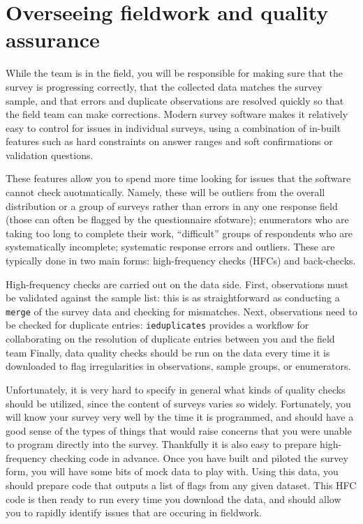 
\section{Overseeing fieldwork and quality assurance}

While the team is in the field, you will be responsible
for making sure that the survey is progressing correctly,
that the collected data matches the survey sample,
and that errors and duplicate observations are resolved
quickly so that the field team can make corrections.
Modern survey software makes it relatively easy
to control for issues in individual surveys,
using a combination of in-built features
such as hard constraints on answer ranges
and soft confirmations or validation questions.

These features allow you to spend more time
looking for issues that the software cannot check auotmatically.
Namely, these will be outliers from the overall distribution
or a group of surveys rather than errors in any one response field
(those can often be flagged by the questionnaire sfotware);
enumerators who are taking too long to complete their work,
``difficult'' groups of respondents who are systematically incomplete;
systematic response errors and outliers.
These are typically done in two main forms:
high-frequency checks (HFCs) and back-checks.

High-frequency checks are carried out on the data side.
First, observations must be validated against the sample list:
this is as straightforward as conducting a \texttt{merge}
of the survey data and checking for mismatches.
Next, observations need to be checked for duplicate entries:
\texttt{ieduplicates}
provides a workflow for collaborating on the resolution of
duplicate entries between you and the field team
Finally, data quality checks
should be run on the data every time it is downloaded
to flag irregularities in observations, sample groups, or enumerators.

Unfortunately, it is very hard to specify in general
what kinds of quality checks should be utilized,
since the content of surveys varies so widely.
Fortunately, you will know your survey very well
by the time it is programmed, and should have a good sense
of the types of things that would raise concerns
that you were unable to program directly into the survey.
Thankfully it is also easy to prepare high-frequency checking code in advance.
Once you have built and piloted the survey form,
you will have some bits of mock data to play with.
Using this data, you should prepare code that outputs
a list of flags from any given dataset.
This HFC code is then ready to run every time you download the data,
and should allow you to rapidly identify issues
that are occuring in fieldwork.

